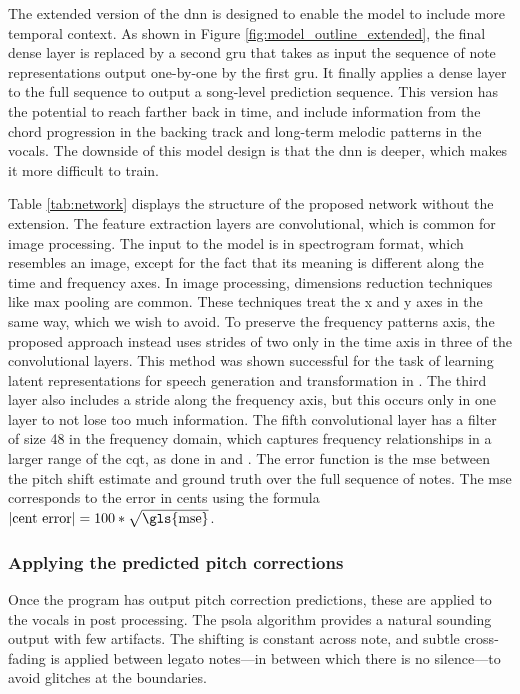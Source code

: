 The extended version of the \gls{dnn} is designed to enable the model to include more temporal context. As shown in Figure \ref{fig:model_outline_extended}, the final dense layer is replaced by a second \gls{gru} that takes as input the sequence of note representations output one-by-one by the first \gls{gru}. It finally applies a dense layer to the full sequence to output a song-level prediction sequence. This version has the potential to reach farther back in time, and include information from the chord progression in the backing track and long-term melodic patterns in the vocals. The downside of this model design is that the \gls{dnn} is deeper, which makes it more difficult to train. 

Table \ref{tab:network} displays the structure of the proposed network without the extension. The feature extraction layers are convolutional, which is common for image processing. The input to the model is in spectrogram format, which resembles an image, except for the fact that its meaning is different along the time and frequency axes. In image processing, dimensions reduction techniques like max pooling are common. These techniques treat the x and y axes in the same way, which we wish to avoid. To preserve the frequency patterns axis, the proposed approach instead uses strides of two only in the time axis in three of the convolutional layers. This method was shown successful for the task of learning latent representations for speech generation and transformation in \cite{hsu2017learning}. The third layer also includes a stride along the frequency axis, but this occurs only in one layer to not lose too much information. The fifth convolutional layer has a filter of size 48 in the frequency domain, which captures frequency relationships in a larger range of the \gls{cqt}, as done in \cite{bittner2017deep} and \cite{hsu2017learning}. 
The error function is the \gls{mse} between the pitch shift estimate and ground truth over the full sequence of notes. The \gls{mse} corresponds to the error in cents using the formula $\left|\text{cent error}\right| = 100 * \sqrt{\text{\gls{mse}}}$. %

\subsubsection{Applying the predicted pitch corrections}
Once the program has output pitch correction predictions, these are applied to the vocals in post processing. The \gls{psola} algorithm provides a natural sounding output with few artifacts. The shifting is constant across note, and subtle cross-fading is applied between legato notes---in between which there is no silence---to avoid glitches at the boundaries.

